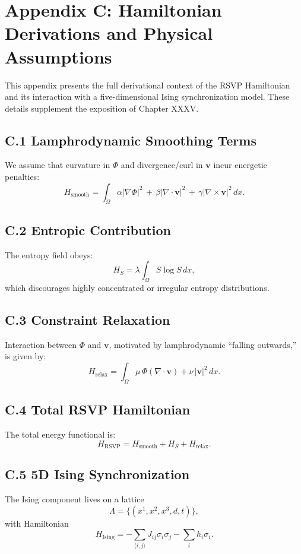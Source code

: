\documentclass[12pt,letterpaper]{article}
\begin{document}
\section{Appendix C: Hamiltonian Derivations and Physical Assumptions}

This appendix presents the full derivational context of the RSVP Hamiltonian and
its interaction with a five-dimensional Ising synchronization model.  These
details supplement the exposition of Chapter XXXV.

\subsection*{C.1 Lamphrodynamic Smoothing Terms}
We assume that curvature in $\Phi$ and divergence/curl in $\mathbf{v}$ incur
energetic penalties:
\[
H_{\text{smooth}}
=
\int_{\Omega}
\alpha |\nabla\Phi|^2
\,+\,
\beta|\nabla\cdot\mathbf{v}|^2
\,+\,
\gamma|\nabla\times\mathbf{v}|^2
\,dx.
\]

\subsection*{C.2 Entropic Contribution}
The entropy field obeys:
\[
H_S
=
\lambda\int_{\Omega} S\log S \, dx,
\]
which discourages highly concentrated or irregular entropy distributions.

\subsection*{C.3 Constraint Relaxation}
Interaction between $\Phi$ and $\mathbf{v}$, motivated by lamphrodynamic
``falling outwards,'' is given by:
\[
H_{\text{relax}}
=
\int_{\Omega}
\mu\,\Phi(\nabla\cdot\mathbf{v})
+ \nu\,|\mathbf{v}|^2
\,dx.
\]

\subsection*{C.4 Total RSVP Hamiltonian}
The total energy functional is:
\[
H_{\text{RSVP}}
=
H_{\text{smooth}}
+ H_S
+ H_{\text{relax}}.
\]

\subsection*{C.5 5D Ising Synchronization}
The Ising component lives on a lattice
\[
\Lambda = \{(x^1,x^2,x^3,d,t)\},
\]
with Hamiltonian
\[
H_{\text{Ising}}
=
-\sum_{\langle i,j\rangle} J_{ij}\sigma_i\sigma_j
- \sum_i h_i \sigma_i.
\]
\end{document}
